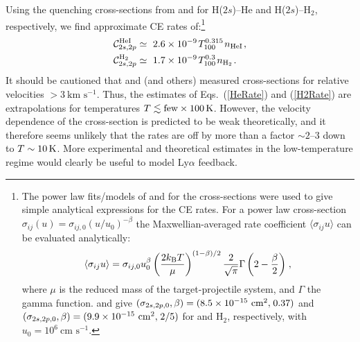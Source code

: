 \documentclass[fleqn,usenatbib]{mnras}
\newcommand\HeI{\ion{He}{I}\xspace} %
\begin{document}
Using the quenching cross-sections from \cite{Ryan1977} and \cite{Vassilev1990} for H($2s$)--He and H($2s$)--H$_2$, respectively, we find approximate CE rates of:\footnote{The power law fits/models of \cite{Ryan1977} and \cite{Vassilev1990} for the cross-sections were used to give simple analytical expressions for the CE rates. For a power law cross-section $\sigma_{ij}(u) = \sigma_{ij,0} (u/u_0)^{-\beta}$ the Maxwellian-averaged rate coefficient $\langle \sigma_{ij} u \rangle$ can be evaluated analytically:
\begin{equation}
    \langle \sigma_{ij} u \rangle = \sigma_{ij,0} u_{0}^{\beta} \left( \dfrac{2 k_{\rm B} T}{\mu} \right)^{(1-\beta)/2} \dfrac{2}{\sqrt{\pi}}\Gamma\left( 2 - \dfrac{\beta}{2} \right) \hspace{1 pt} \nonumber,
\end{equation}
where $\mu$ is the reduced mass of the target-projectile system, and $\Gamma$ the gamma function. \cite{Ryan1977} and \cite{Vassilev1990} give $(\sigma_{2s,2p,0},\beta) = (8.5\times 10^{-15} ~ \textrm{cm}^2, \hspace{1 pt} 0.37)$ and $(\sigma_{2s,2p,0},\beta) = (9.9\times 10^{-15} ~ \textrm{cm}^2, \hspace{1 pt} 2/5)$ for \HeI and H$_2$, respectively, with $u_0 = 10^6 ~ \textrm{cm s}^{-1}$.} 
\begin{align}
    \mathcal{C}_{2s,2p}^{\rm HeI} &\simeq~ 2.6 \times 10^{-9} \hspace{1 pt} T_{100}^{0.315} \hspace{1 pt} n_{\rm HeI} \label{HeRate} \hspace{1 pt} , \\
    \mathcal{C}_{2s,2p}^{\rm H_2} &\simeq~ 1.7 \times 10^{-9} \hspace{1 pt} T_{100}^{0.3} \hspace{1 pt} n_{\rm H_2} \label{H2Rate} \hspace{1 pt} .
\end{align}
It should be cautioned that \cite{Ryan1977} and \cite{Vassilev1990} (and others) measured cross-sections for relative velocities $> 3  ~ \textrm{km }\textrm{s}^{-1}$. Thus, the estimates of Eqs.~(\ref{HeRate}) and (\ref{H2Rate}) are extrapolations for temperatures $T \lesssim \textrm{few} \times 100\,\rm K$. However, the velocity dependence of the cross-section is predicted to be weak theoretically, and it therefore seems unlikely that the rates are off by more than a factor $\sim 2$--$3$ down to $T \sim 10\,\rm K$. More experimental and theoretical estimates in the low-temperature regime would clearly be useful to model Ly$\alpha$ feedback. 
\end{document}
